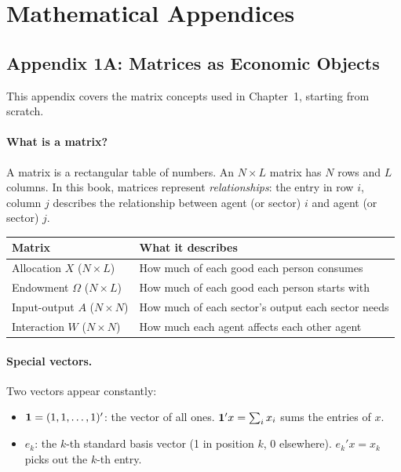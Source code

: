 \documentclass[../structural_economics_book.tex]{subfiles}
\begin{document}
\newpage
\section*{Mathematical Appendices}


\subsection*{Appendix 1A: Matrices as Economic Objects}
\label{ch01:app:matrices}

This appendix covers the matrix concepts used in Chapter~1, starting from scratch.

\paragraph{What is a matrix?} A matrix is a rectangular table of numbers. An $N \times L$ matrix has $N$ rows and $L$ columns. In this book, matrices represent \textit{relationships}: the entry in row $i$, column $j$ describes the relationship between agent (or sector) $i$ and agent (or sector) $j$.

\begin{center}
\begin{tabular}{ll}
\toprule
\textbf{Matrix} & \textbf{What it describes} \\
\midrule
Allocation $X$ ($N \times L$) & How much of each good each person consumes \\
Endowment $\Omega$ ($N \times L$) & How much of each good each person starts with \\
Input-output $A$ ($N \times N$) & How much of each sector's output each sector needs \\
Interaction $W$ ($N \times N$) & How much each agent affects each other agent \\
\bottomrule
\end{tabular}
\end{center}

\paragraph{Special vectors.} Two vectors appear constantly:
\begin{itemize}
\item $\mathbf{1} = (1, 1, \ldots, 1)'$: the vector of all ones. $\mathbf{1}'x = \sum_i x_i$ sums the entries of $x$.
\item $e_k$: the $k$-th standard basis vector (1 in position $k$, 0 elsewhere). $e_k'x = x_k$ picks out the $k$-th entry.
\end{itemize}
\end{document}

